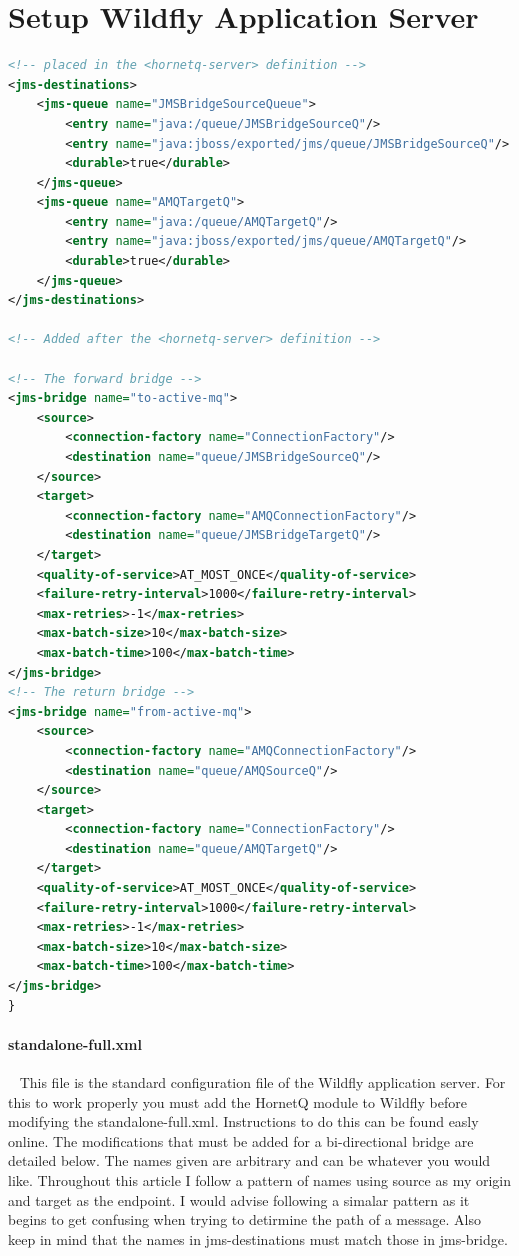 \documentclass[
10pt, %
letterpaper, %
oneside, %
headinclude,footinclude, %
BCOR5mm, %
]{scrartcl}
\begin{document}

\section{Setup Wildfly Application Server}


\begin{lstlisting}[language=XML]
<!-- placed in the <hornetq-server> definition -->
<jms-destinations>
	<jms-queue name="JMSBridgeSourceQueue">
		<entry name="java:/queue/JMSBridgeSourceQ"/>
		<entry name="java:jboss/exported/jms/queue/JMSBridgeSourceQ"/>
		<durable>true</durable>
	</jms-queue>
	<jms-queue name="AMQTargetQ">
		<entry name="java:/queue/AMQTargetQ"/>
		<entry name="java:jboss/exported/jms/queue/AMQTargetQ"/>
		<durable>true</durable>
	</jms-queue>
</jms-destinations>

<!-- Added after the <hornetq-server> definition -->

<!-- The forward bridge -->
<jms-bridge name="to-active-mq">
	<source>
		<connection-factory name="ConnectionFactory"/>
		<destination name="queue/JMSBridgeSourceQ"/>
	</source>
	<target>
		<connection-factory name="AMQConnectionFactory"/>
		<destination name="queue/JMSBridgeTargetQ"/>
	</target>
	<quality-of-service>AT_MOST_ONCE</quality-of-service>
	<failure-retry-interval>1000</failure-retry-interval>
	<max-retries>-1</max-retries>
	<max-batch-size>10</max-batch-size>
	<max-batch-time>100</max-batch-time>
</jms-bridge>
<!-- The return bridge -->
<jms-bridge name="from-active-mq">
	<source>
		<connection-factory name="AMQConnectionFactory"/>
		<destination name="queue/AMQSourceQ"/>
	</source>
	<target>
		<connection-factory name="ConnectionFactory"/>
		<destination name="queue/AMQTargetQ"/>
	</target>
	<quality-of-service>AT_MOST_ONCE</quality-of-service>
	<failure-retry-interval>1000</failure-retry-interval>
	<max-retries>-1</max-retries>
	<max-batch-size>10</max-batch-size>
	<max-batch-time>100</max-batch-time>
</jms-bridge>
}
\end{lstlisting}

\paragraph{standalone-full.xml} ~\newline\newline
This file is the standard configuration file of the Wildfly application server. For this to work properly you must add the HornetQ module to Wildfly before modifying the standalone-full.xml. Instructions to do this can be found easly online. The modifications that must be added for a bi-directional bridge are detailed below. The names given are arbitrary and can be whatever you would like. Throughout this article I follow a pattern of names using source as my origin and target as the endpoint. I would advise following a simalar pattern as it begins to get confusing when trying to detirmine the path of a message. Also keep in mind that the names in jms-destinations must match those in jms-bridge.\newline
\end{document}
